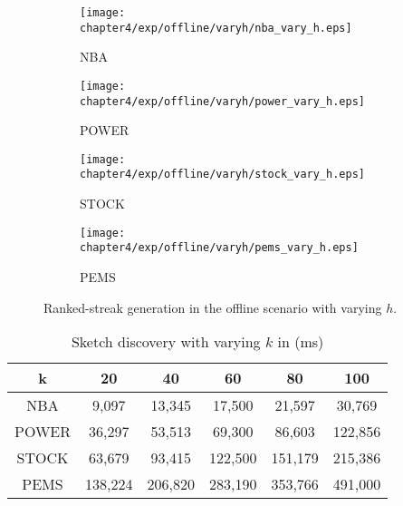 \begin{figure}[t]
\centering
    \begin{subfigure}[b]{0.45\textwidth}
        \texttt{[image: chapter4/exp/offline/varyh/nba\_vary\_h.eps]}
        \caption{NBA}
    \end{subfigure}
    \begin{subfigure}[b]{0.45\textwidth}
        \texttt{[image: chapter4/exp/offline/varyh/power\_vary\_h.eps]}
        \caption{POWER}
    \end{subfigure}
    \begin{subfigure}[b]{0.45\textwidth}
        \texttt{[image: chapter4/exp/offline/varyh/stock\_vary\_h.eps]}
        \caption{STOCK}
    \end{subfigure}
    \begin{subfigure}[b]{0.45\textwidth}
        \texttt{[image: chapter4/exp/offline/varyh/pems\_vary\_h.eps]}        
        \caption{PEMS}
    \end{subfigure}
\caption{Ranked-streak generation in the offline scenario with varying $h$.}
\label{exp:offline_performance_vary_n}
\end{figure}



\begin{table}
\centering
\caption{Sketch discovery with varying $k$ in (ms)}\label{exp:offline_greedy}
\begin{tabular}{|c|c|c|c|c|c|}
\hline 
\textbf{k} & \textbf{20} & \textbf{40} & \textbf{60} & \textbf{80}& \textbf{100} \\ 
\hline 
NBA & 9,097 & 13,345	& 17,500	& 21,597 & 	30,769 \\ 
\hline 
POWER & 36,297 & 53,513 & 69,300 &	86,603 &	122,856
\\ 
\hline 
STOCK & 63,679	& 93,415 &	122,500 &	151,179 &	215,386\\ 
\hline 
PEMS & 138,224	& 206,820 &	283,190 &	353,766	& 491,000 \\ 
\hline 
\end{tabular} 
\end{table}





